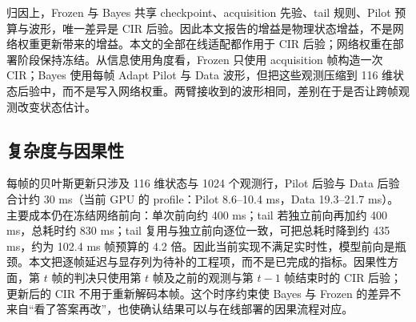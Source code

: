 归因上，Frozen 与 Bayes 共享 checkpoint、acquisition 先验、tail 规则、Pilot 预算与波形，唯一差异是 CIR 后验。因此本文报告的增益是物理状态增益，不是网络权重更新带来的增益。本文的全部在线适配都作用于 CIR 后验；网络权重在部署阶段保持冻结。从信息使用角度看，Frozen 只使用 acquisition 帧构造一次 CIR；Bayes 使用每帧 Adapt Pilot 与 Data 波形，但把这些观测压缩到 116 维状态后验中，而不是写入网络权重。两臂接收到的波形相同，差别在于是否让跨帧观测改变状态估计。

\subsection{复杂度与因果性}

每帧的贝叶斯更新只涉及 116 维状态与 1024 个观测行，Pilot 后验与 Data 后验合计约 30 ms（当前 GPU 的 profile：Pilot 8.6–10.4 ms，Data 19.3–21.7 ms）。主要成本仍在冻结网络前向：单次前向约 400 ms；tail 若独立前向再加约 400 ms，总耗时约 830 ms；tail 复用与独立前向逐位一致，可把总耗时降到约 435 ms，约为 102.4 ms 帧预算的 4.2 倍。因此当前实现不满足实时性，模型前向是瓶颈。本文把逐帧延迟与显存列为待补的工程项，而不是已完成的指标。因果性方面，第 $t$ 帧的判决只使用第 $t$ 帧及之前的观测与第 $t-1$ 帧结束时的 CIR 后验；更新后的 CIR 不用于重新解码本帧。这个时序约束使 Bayes 与 Frozen 的差异不来自“看了答案再改”，也使确认结果可以与在线部署的因果流程对应。
